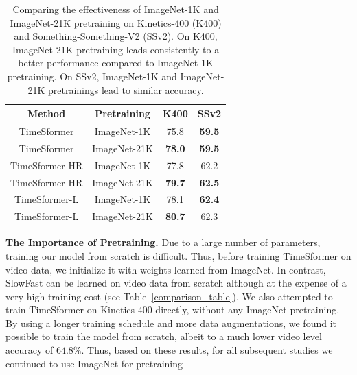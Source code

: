 \documentclass{article}
\begin{document}
 
 \begin{table}
\centering
{%
\scriptsize
 \begin{tabular}{c c c c }
 \hline
 {Method} & {Pretraining} & {K400} & {SSv2} \\ 
 \hline
TimeSformer & ImageNet-1K & 75.8  & \bf 59.5 \\
TimeSformer & ImageNet-21K & \bf 78.0  & \bf 59.5 \\ \hline
TimeSformer-HR & ImageNet-1K  & 77.8  &  62.2 \\
TimeSformer-HR & ImageNet-21K  & \bf 79.7  & \bf 62.5 \\ \hline
TimeSformer-L & ImageNet-1K & 78.1 & \bf 62.4\\ 
TimeSformer-L & ImageNet-21K & \bf 80.7 & 62.3\\ 
 \hline
 \end{tabular}
 }
  \vspace{-0.1cm}
\caption{Comparing the effectiveness of ImageNet-1K and ImageNet-21K pretraining on Kinetics-400 (K400) and Something-Something-V2 (SSv2). On K400, ImageNet-21K pretraining leads consistently to a better performance compared to ImageNet-1K pretraining. On SSv2, ImageNet-1K and ImageNet-21K pretrainings lead to similar accuracy.\vspace{-0.3cm}}
\label{pretraining_results_table}
 \end{table}


\textbf{The Importance of Pretraining.} Due to a large number of parameters, training our model from scratch is difficult. Thus, before training TimeSformer on video data, we initialize it with weights learned from ImageNet. In contrast, SlowFast can be learned on video data from scratch although at the expense of a very high training cost  (see Table~\ref{comparison_table}). We also attempted to train TimeSformer on Kinetics-400 directly, without any ImageNet pretraining. By using a longer training schedule and more data augmentations, we found it possible to train the model from scratch, albeit to a much lower video level accuracy of $64.8\%$. Thus, based on these results, for all subsequent studies we continued to use ImageNet for pretraining~\cite{5206848}
\end{document}
